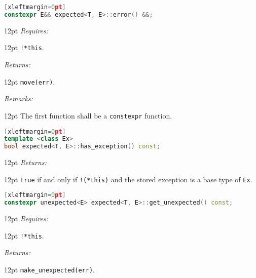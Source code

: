 \documentclass[a4paper,10pt]{article}
\newcommand{\cpp}[1]{\lstinline{#1}}
\newcommand{\wordingItem}[1]{\noindent\textit{#1:}}
\newenvironment{wordingTextItem}[1]{\wordingItem{#1}\vspace{2pt}\noindent\begin{adjustwidth}{12pt}{}}{\vspace{2pt}\end{adjustwidth}}
\newenvironment{wordingPara}{\begin{adjustwidth}{12pt}{}}{\end{adjustwidth}}
\begin{document}
\begin{lstlisting}[language=C++][xleftmargin=0pt]
constexpr E&& expected<T, E>::error() &&; 
\end{lstlisting}
\begin{wordingPara}
\begin{wordingTextItem}{Requires}
\cpp{!*this}.
\end{wordingTextItem}
\begin{wordingTextItem}{Returns}
\cpp{move(err)}.
\end{wordingTextItem}
\begin{wordingTextItem}{Remarks}
The first function shall be a \cpp{constexpr} function.
\end{wordingTextItem}
\end{wordingPara}

\begin{lstlisting}[language=C++][xleftmargin=0pt]
template <class Ex>
bool expected<T, E>::has_exception() const;
\end{lstlisting}
\begin{wordingPara}
\begin{wordingTextItem}{Returns}
\cpp{true} if and only if \cpp{!(*this)} and the stored exception is a base type of \cpp{Ex}.
\end{wordingTextItem}
\end{wordingPara}


\begin{lstlisting}[language=C++][xleftmargin=0pt]
constexpr unexpected<E> expected<T, E>::get_unexpected() const;
\end{lstlisting}
\begin{wordingPara}
\begin{wordingTextItem}{Requires}
\cpp{!*this}.
\end{wordingTextItem}
\begin{wordingTextItem}{Returns}
\cpp{make_unexpected(err)}.
\end{wordingTextItem}
\end{wordingPara}
\end{document}
